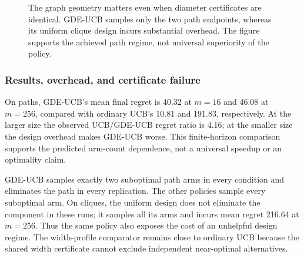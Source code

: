 \begin{figure}[t]
\centering
{}
\caption{The graph geometry matters even when diameter certificates are identical. GDE-UCB samples only the two path endpoints, whereas its uniform clique design incurs substantial overhead. The figure supports the achieved path regime, not universal superiority of the policy.}
\label{alignment_paper:fig:geometryscaling}
\end{figure}



\subsubsection{Results, overhead, and certificate failure}

On paths, GDE-UCB's mean final regret is 40.32 at $m=16$ and 46.08 at $m=256$, compared with ordinary UCB's 10.81 and 191.83, respectively. At the larger size the observed UCB/GDE-UCB regret ratio is 4.16; at the smaller size the design overhead makes GDE-UCB worse. This finite-horizon comparison supports the predicted arm-count dependence, not a universal speedup or an optimality claim.

GDE-UCB samples exactly two suboptimal path arms in every condition and eliminates the path in every replication. The other policies sample every suboptimal arm. On cliques, the uniform design does not eliminate the component in these runs; it samples all its arms and incurs mean regret 216.64 at $m=256$. Thus the same policy also exposes the cost of an unhelpful design regime. The width-profile comparator remains close to ordinary UCB because the shared width certificate cannot exclude independent near-optimal alternatives.



